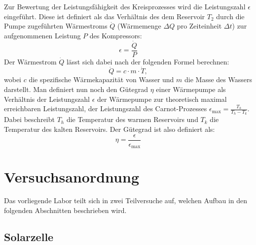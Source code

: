 \documentclass[english, ngerman]{scrartcl}
\begin{document}
Zur Bewertung der Leistungsfähigkeit des Kreisprozesses wird die Leistungszahl $\epsilon$ eingeführt. Diese ist definiert als das Verhältnis des dem Reservoir $T_2$ durch die Pumpe zugeführten Wärmestroms $\dot{Q}$ (Wärmemenge $\Delta Q$ pro Zeiteinheit $\Delta t$) zur aufgenommenen Leistung $P$ des Kompressors:
%
\begin{equation}
    \label{eq:leistungszahl}
    \epsilon = \frac{\dot{Q}}{P}
\end{equation}
%
Der Wärmestrom $\dot{Q}$ lässt sich dabei nach der folgenden Formel berechnen:
%
\begin{equation}
    \label{eq:waermestrom}
    \dot{Q} = c \cdot m \cdot \dot{T},
\end{equation}
%
wobei $c$ die spezifische Wärmekapazität von Wasser und $m$ die Masse des Wassers darstellt. Man definiert nun noch den Gütegrad $\eta$ einer Wärmepumpe als Verhältnis der Leistungszahl $\epsilon$ der Wärmepumpe zur theoretisch maximal erreichbaren Leistungszahl, der Leistungszahl des Carnot-Prozesses $\epsilon_{\text{max}} = \frac{T_h}{T_h-T_k}$. Dabei beschreibt $T_h$ die Temperatur des warmen Reservoirs und $T_k$ die Temperatur des kalten Reservoirs. Der Gütegrad ist also definiert als:
%
\begin{equation}
    \label{eq:guetegrad}
    \eta = \frac{\epsilon}{\epsilon_{\text{max}}}
\end{equation}



\section{Versuchsanordnung}
\label{sec:versuchsanordnung}

Das vorliegende Labor teilt sich in zwei Teilversuche auf, welchen Aufbau in den folgenden Abschnitten beschrieben wird.

\subsection{Solarzelle}
\label{subsec:anordnung_solarzelle}
\end{document}
